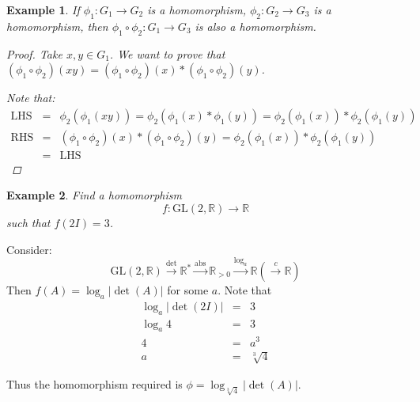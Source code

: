 \documentclass{article}
\theoremstyle{MyNonumberplain}
\theoremstyle{break}
\newtheorem*{proof}{Proof. }
\newcommand{\p}{\phi}
\newcommand{\tmop}{\text}
\theoremstyle{break}
\newtheorem{example}{Example}[section]
\theoremstyle{break}
\theoremstyle{definition}
\theoremstyle{break}
\begin{document}
\begin{expbox}
    \begin{example}
        If $\p_1 : G_1 \rightarrow G_2$ is a homomorphism, $\p_2 : G_2 \rightarrow
        G_3$ is a homomorphism, then $\p_1 \circ \p_2 : G_1 \rightarrow G_3$ is also a
        homomorphism.
        \begin{prfbox}
            \begin{proof}
                Take $x, y \in G_1$. We want to prove that $\left( \p_1 \circ \p_2 \right) (x
                y) = \left( \p_1 \circ \p_2 \right) (x) \ast \left( \p_1 \circ \p_2 \right)
                (y)$.

                Note that:
                \begin{eqnarray*}
                \tmop{LHS} & = & \p_2 \left( \p_1 (x y) \right) = \p_2 \left( \p_1 (x) \ast
                \p_1 (y) \right) = \p_2 \left( \p_1 (x) \right) \ast \p_2 \left( \p_1 (y)
                \right)\\
                \tmop{RHS} & = & \left( \p_1 \circ \p_2 \right) (x) \ast \left( \p_1 \circ
                \p_2 \right) (y) = \p_2 \left( \p_1 (x) \right) \ast \p_2 \left( \p_1 (y)
                \right)\\
                & = & \tmop{LHS}
                \end{eqnarray*}
            \end{proof}
        \end{prfbox}
    \end{example}
\end{expbox}

\begin{expbox}
    \begin{example}
        Find a homomorphism
        \[ f : \tmop{GL} (2, \mathbb{R}) \rightarrow \mathbb{R} \]
        such that $f (2 I) = 3$. 
    \end{example}
    \begin{ansbox}
            Consider:
            \[ \tmop{GL} (2, \mathbb{R}) \xrightarrow{\det} \mathbb{R}^{\ast}
               \xrightarrow{\tmop{abs}} \mathbb{R}_{> 0} \xrightarrow{\log_a} \mathbb{R}
               \left( \xrightarrow{c} \mathbb{R} \right) \]
            Then $f (A) = \log_a | \det (A) |$ for some $a$. Note that
            \begin{eqnarray*}
              \log_a | \det (2 I) | & = & 3\\
              \log_a 4 & = & 3\\
              4 & = & a^3\\
              a & = & \sqrt[3]{4}
            \end{eqnarray*}
          
          Thus the homomorphism required is $\p = \log_{\sqrt[3]{4}} | \det (A) |$.
    \end{ansbox}
\end{expbox}
\end{document}
